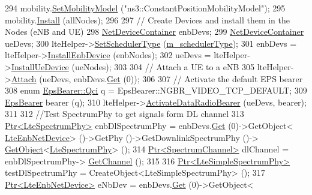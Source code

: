 \begin{DoxyCode}
294   mobility.\hyperlink{classns3_1_1MobilityHelper_a030275011b6f40682e70534d30280aba}{SetMobilityModel} (\textcolor{stringliteral}{"ns3::ConstantPositionMobilityModel"});
295   mobility.\hyperlink{classns3_1_1MobilityHelper_a07737960ee95c0777109cf2994dd97ae}{Install} (allNodes);
296 
297   \textcolor{comment}{// Create Devices and install them in the Nodes (eNB and UE)}
298   \hyperlink{classns3_1_1NetDeviceContainer}{NetDeviceContainer} enbDevs;
299   \hyperlink{classns3_1_1NetDeviceContainer}{NetDeviceContainer} ueDevs;
300   lteHelper->\hyperlink{classns3_1_1LteHelper_a8f86e55b8b80a81732c4b2df00fb25d5}{SetSchedulerType} (\hyperlink{classLteHardFrTestCase_ad7381bb278529dc0cb3102e5af645994}{m\_schedulerType});
301   enbDevs = lteHelper->\hyperlink{classns3_1_1LteHelper_a5e009ad35ef85f46b5a6099263f15a03}{InstallEnbDevice} (enbNodes);
302   ueDevs = lteHelper->\hyperlink{classns3_1_1LteHelper_ac9cd932d7de92811cfa953c2e3b2fc9f}{InstallUeDevice} (ueNodes);
303 
304   \textcolor{comment}{// Attach a UE to a eNB}
305   lteHelper->\hyperlink{classns3_1_1LteHelper_a9466743f826aa2652a87907b7f0a1c87}{Attach} (ueDevs, enbDevs.\hyperlink{classns3_1_1NetDeviceContainer_a677d62594b5c9d2dea155cc5045f4d0b}{Get} (0));
306 
307   \textcolor{comment}{// Activate the default EPS bearer}
308   \textcolor{keyword}{enum} \hyperlink{structns3_1_1EpsBearer_aecf0c67109c5eb4ec0b07226fff5885e}{EpsBearer::Qci} q = EpsBearer::NGBR\_VIDEO\_TCP\_DEFAULT;
309   \hyperlink{structns3_1_1EpsBearer}{EpsBearer} bearer (q);
310   lteHelper->\hyperlink{classns3_1_1LteHelper_ac896e16cf162e4beeaa292d39ab1b700}{ActivateDataRadioBearer} (ueDevs, bearer);
311 
312   \textcolor{comment}{//Test SpectrumPhy to get signals form DL channel}
313   \hyperlink{classns3_1_1Ptr}{Ptr<LteSpectrumPhy>} enbDlSpectrumPhy = enbDevs.\hyperlink{classns3_1_1NetDeviceContainer_a677d62594b5c9d2dea155cc5045f4d0b}{Get} (0)->GetObject<
      \hyperlink{classns3_1_1LteEnbNetDevice}{LteEnbNetDevice}> ()->GetPhy ()->GetDownlinkSpectrumPhy ()->
      \hyperlink{classns3_1_1Object_a13e18c00017096c8381eb651d5bd0783}{GetObject}<\hyperlink{classns3_1_1LteSpectrumPhy}{LteSpectrumPhy}> ();
314   \hyperlink{classns3_1_1Ptr}{Ptr<SpectrumChannel>} dlChannel = enbDlSpectrumPhy->
      \hyperlink{classns3_1_1LteSpectrumPhy_a50f13e43568687ee32c5d63e5bf639c2}{GetChannel} ();
315 
316   \hyperlink{classns3_1_1Ptr}{Ptr<LteSimpleSpectrumPhy>} testDlSpectrumPhy = CreateObject<LteSimpleSpectrumPhy>
       ();
317   \hyperlink{classns3_1_1Ptr}{Ptr<LteEnbNetDevice>} eNbDev = enbDevs.\hyperlink{classns3_1_1NetDeviceContainer_a677d62594b5c9d2dea155cc5045f4d0b}{Get} (0)->GetObject<

\end{DoxyCode}
